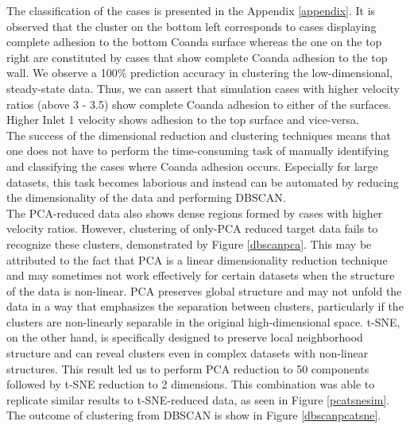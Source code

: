 The classification of the cases is presented in the Appendix \ref{appendix}. It is observed that the cluster on the bottom left corresponds to cases displaying complete adhesion to the bottom Coanda surface whereas the one on the top right are constituted by cases that show complete Coanda adhesion to the top wall. We observe a 100\% prediction accuracy in clustering the low-dimensional, steady-state data. Thus, we can assert that simulation cases with higher velocity ratios (above 3 - 3.5) show complete Coanda adhesion to either of the surfaces. Higher Inlet 1 velocity shows adhesion to the top surface and vice-versa. \\
The success of the dimensional reduction and clustering techniques means that one does not have to perform the time-consuming task of manually identifying and classifying the cases where Coanda adhesion occurs. Especially for large datasets, this task becomes laborious and instead can be automated by reducing the dimensionality of the data and performing DBSCAN. \\
The PCA-reduced data also shows dense regions formed by cases with higher velocity ratios. However, clustering of only-PCA reduced target data fails to recognize these clusters, demonstrated by Figure \ref{dbscanpca}. This may be attributed to the fact that PCA is a linear dimensionality reduction technique and may sometimes not work effectively for certain datasets when the structure of the data is non-linear. PCA preserves global structure and may not unfold the data in a way that emphasizes the separation between clusters, particularly if the clusters are non-linearly separable in the original high-dimensional space. t-SNE, on the other hand, is specifically designed to preserve local neighborhood structure and can reveal clusters even in complex datasets with non-linear structures. This result led us to perform PCA reduction to 50 components followed by t-SNE reduction to 2 dimensions. This combination was able to replicate similar results to t-SNE-reduced data, as seen in Figure \ref{pcatsnesim}. The outcome of clustering from DBSCAN is show in Figure \ref{dbscanpcatsne}. \\

